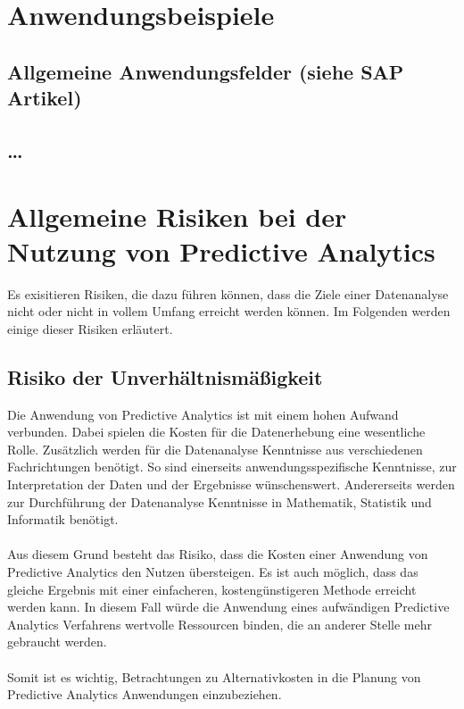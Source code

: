 \section{Anwendungsbeispiele}

\subsection{Allgemeine Anwendungsfelder (siehe SAP Artikel)}

\subsection{\ldots}

\section{Allgemeine Risiken bei der Nutzung von Predictive Analytics}

Es exisitieren Risiken, die dazu führen können, dass die Ziele einer
Datenanalyse nicht oder nicht in vollem Umfang erreicht werden können.
Im Folgenden werden einige dieser Risiken erläutert.

\subsection{Risiko der Unverhältnismäßigkeit}

Die Anwendung von Predictive Analytics ist mit einem hohen Aufwand verbunden.
Dabei spielen die Kosten für die Datenerhebung eine wesentliche Rolle.
Zusätzlich werden für die Datenanalyse Kenntnisse aus verschiedenen
Fachrichtungen benötigt. So sind einerseits anwendungsspezifische Kenntnisse,
zur Interpretation der Daten und der Ergebnisse wünschenswert. Andererseits
werden zur Durchführung der Datenanalyse Kenntnisse in Mathematik, Statistik und
Informatik benötigt. \\ \\
Aus diesem Grund besteht das Risiko, dass die Kosten einer Anwendung von
Predictive Analytics den Nutzen übersteigen. Es ist auch möglich, dass das
gleiche Ergebnis mit einer einfacheren, kostengünstigeren Methode erreicht
werden kann. In diesem Fall würde die Anwendung eines aufwändigen Predictive
Analytics Verfahrens wertvolle Ressourcen binden, die an anderer Stelle mehr
gebraucht werden. \\ \\
Somit ist es wichtig, Betrachtungen zu Alternativkosten  in die 
Planung von Predictive Analytics Anwendungen einzubeziehen. 

